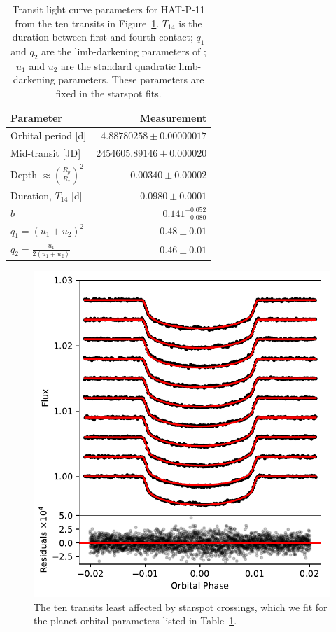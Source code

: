 \begin{table}
\begin{center}
\begin{tabular}{lr}
Parameter & Measurement\\ \hline \hline
Orbital period [d] & $4.88780258 \pm 0.00000017$ \\
Mid-transit [JD] & $2454605.89146 \pm 0.000020$ \\
Depth $\approx \left(\frac{R_p}{R_*}\right)^2$ & $0.00340 \pm 0.00002$\\
Duration, $T_{14}$ [d] & $0.0980 \pm 0.0001$\\
$b$ & $0.141^{+0.052}_{-0.080}$ \\
$q_1 = (u_1 + u_2)^2$ & $0.48 \pm 0.01$ \\ 
$q_2 = \frac{u_1 }{2(u_1 + u_2)}$ & $0.46 \pm 0.01$ 
\end{tabular}
\end{center}
\caption{Transit light curve parameters for HAT-P-11 from the ten transits in Figure~\ref{fig:spotlesstransits}. $T_{14}$ is the duration between first and fourth contact; $q_1$ and $q_2$ are the limb-darkening parameters of \citet{Kipping2013}; $u_1$ and $u_2$ are the standard quadratic limb-darkening parameters. These parameters are fixed in the starspot fits.}
\label{tab:transitprops}
\end{table}

\begin{figure}
\centering
\includegraphics[scale=0.7]{stsp_hat_p_11/hat11_spotless_transits_compact.pdf}
\caption{The ten transits least affected by starspot crossings, which we fit for the planet orbital parameters listed in Table~\ref{tab:transitprops}.}
\label{fig:spotlesstransits}
\end{figure}

